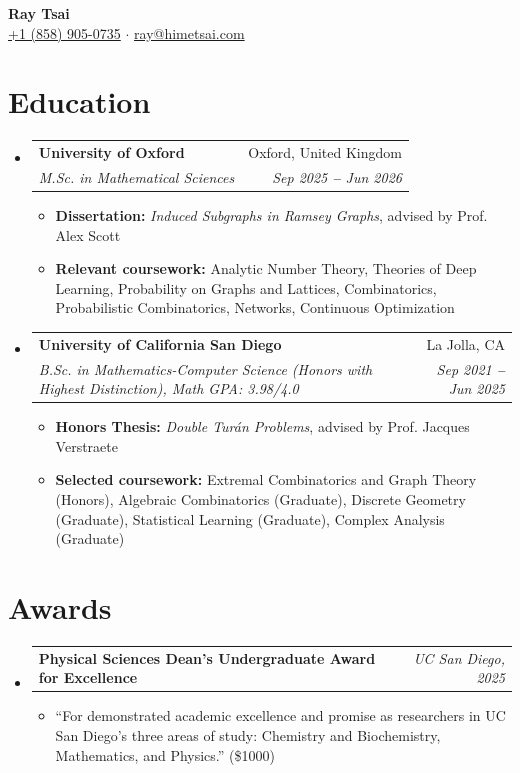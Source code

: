 \documentclass[letterpaper,10pt]{article}
\makeatletter
\newcommand{\resumeItem}[1]{
  \item\small{
    {#1 \vspace{-1pt}}
  }
}
\newcommand{\resumeSubSubheading}[2]{
    \vspace{-2pt}\item
    \begin{tabular*}{0.97\textwidth}{l@{\extracolsep{\fill}}r}
      \textbf{\small#1} & \textit{\small #2} \\
    \end{tabular*}\vspace{-5pt}
}
\newcommand{\resumeEducationHeading}[4]{
  \vspace{-2pt}\item
    \begin{tabular*}{0.97\textwidth}[t]{l@{\extracolsep{\fill}}r}
      \textbf{#1} & #2 \\
      \textit{\small#3} & \textit{\small #4} \\
    \end{tabular*}\vspace{-5pt}
}
\newcommand{\resumeSubHeadingListStart}{\begin{itemize}[leftmargin=0.15in, label={}]}
\newcommand{\resumeSubHeadingListEnd}{\end{itemize}}
\newcommand{\resumeItemListStart}{\begin{itemize}\vspace{-2pt}}
\newcommand{\resumeItemListEnd}{\end{itemize}\vspace{-7pt}}
\makeatother
\begin{document}

\begin{center}
  \textbf{\Huge Ray Tsai} \\ 
  \vspace{8pt}
  \small
  \faMobile \hspace{.5pt} \href{tel:18589050735}{+1 (858) 905-0735}
  $\cdot$
  \faAt \hspace{.5pt} \href{mailto:ray@himetsai.com}{ray@himetsai.com}
\end{center}


\section{Education}
\resumeSubHeadingListStart 
  \resumeEducationHeading {University of Oxford}{Oxford, United Kingdom} {M.Sc. in Mathematical Sciences}{Sep 2025 \textbf{--} Jun 2026}
  \resumeItemListStart 
  \resumeItem{\textbf{Dissertation:} \textit{Induced Subgraphs in Ramsey Graphs}, advised by Prof. Alex Scott} 
    \resumeItem{\textbf{Relevant coursework:} 
    Analytic Number Theory, Theories of Deep Learning, Probability on Graphs and Lattices, Combinatorics, Probabilistic Combinatorics, Networks, Continuous Optimization} 
  \resumeItemListEnd

  \vspace{3pt}

  \resumeEducationHeading {University of California San Diego}{La Jolla, CA} {B.Sc. in Mathematics-Computer Science (Honors with Highest Distinction), Math GPA: 3.98/4.0}{Sep 2021 \textbf{--} Jun 2025}
  \resumeItemListStart 
    \resumeItem{\textbf{Honors Thesis:} \textit{Double Turán Problems}, advised by Prof. Jacques Verstraete} 
    \resumeItem{\textbf{Selected coursework:} Extremal Combinatorics and Graph Theory (Honors), Algebraic Combinatorics (Graduate), Discrete Geometry (Graduate), Statistical Learning (Graduate), Complex Analysis (Graduate)} 
  \resumeItemListEnd 
\resumeSubHeadingListEnd


\section{Awards}
\resumeSubHeadingListStart
  \resumeSubSubheading{Physical Sciences Dean's Undergraduate Award for Excellence}{UC San Diego, 2025}
  \resumeItemListStart
      \resumeItem{``For demonstrated academic excellence and promise as researchers in UC San Diego's three areas of study: Chemistry and Biochemistry, Mathematics, and Physics.'' (\$1000)}
    \resumeItemListEnd
\resumeSubHeadingListEnd
\end{document}
